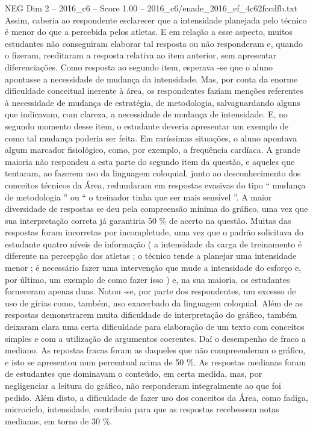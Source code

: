 \begin{textsample}{NEG Dim 2 – 2016\_c6 – Score 1.00 – 2016\_c6/enade\_2016\_ef\_4c62fccdfb.txt}
Assim, caberia ao respondente esclarecer que a intensidade planejada pelo técnico é menor do que a percebida pelos atletas.
E em relação a esse aspecto, muitos estudantes não conseguiram elaborar tal resposta ou não responderam e, quando o fizeram, reeditaram a resposta relativa ao item anterior, sem apresentar diferenciações.
Como resposta ao segundo item, esperava -se que o aluno apontasse a necessidade de mudança da intensidade.
Mas, por conta da enorme dificuldade conceitual inerente à área, os respondentes faziam menções referentes à necessidade de mudança de estratégia, de metodologia, salvaguardando alguns que indicavam, com clareza, a necessidade de mudança de intensidade.
E, no segundo momento desse item, o estudante deveria apresentar um exemplo de como tal mudança poderia ser feita.
Em raríssimas situações, o aluno apontava algum marcador fisiológico, como, por exemplo, a frequência cardíaca.
A grande maioria não respondeu a esta parte do segundo item da questão, e aqueles que tentaram, ao fazerem uso da linguagem coloquial, junto ao desconhecimento dos conceitos técnicos da Área, redundaram em respostas evasivas do tipo “ mudança de metodologia ” ou “ o treinador tinha que ser mais sensível ”.
A maior diversidade de respostas se deu pela compreensão mínima do gráfico, uma vez que sua interpretação correta já garantiria 50 \% de acerto na questão.
Muitas das respostas foram incorretas por incompletude, uma vez que o padrão solicitava do estudante quatro níveis de informação ( a intensidade da carga de treinamento é diferente na percepção dos atletas ; o técnico tende a planejar uma intensidade menor ; é necessário fazer uma intervenção que mude a intensidade do esforço e, por último, um exemplo de como fazer isso ) e, na sua maioria, os estudantes forneceram apenas duas.
Notou -se, por parte dos respondentes, um excesso de uso de gírias como, também, uso exacerbado da linguagem coloquial.
Além de as respostas demonstrarem muita dificuldade de interpretação do gráfico, também deixaram clara uma certa dificuldade para elaboração de um texto com conceitos simples e com a utilização de argumentos coerentes.
Daí o desempenho de fraco a mediano.
As repostas fracas foram as daqueles que não compreenderam o gráfico, e isto se apresentou num percentual acima de 50 \%.
As respostas medianas foram de estudantes que dominavam o conteúdo, em certa medida, mas, por negligenciar a leitura do gráfico, não responderam integralmente ao que foi pedido.
Além disto, a dificuldade de fazer uso dos conceitos da Área, como fadiga, microciclo, intensidade, contribuiu para que as respostas recebessem notas medianas, em torno de 30 \%.

\end{textsample}
